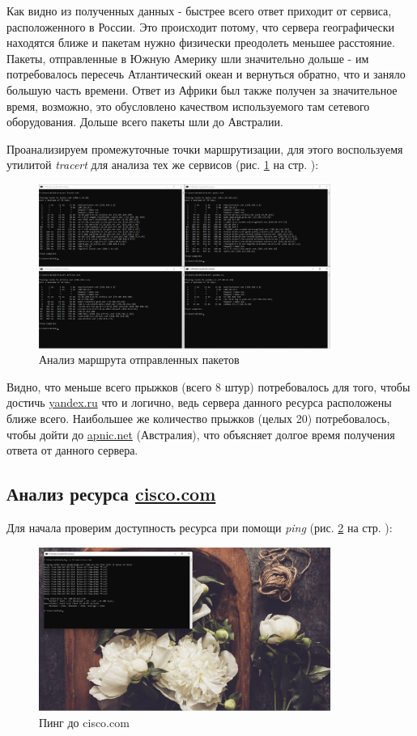 \documentclass[a4paper]{article}
\begin{document}
  Как видно из полученных данных - быстрее всего ответ приходит от сервиса, расположенного в России.
  Это происходит потому, что сервера географически находятся ближе и пакетам нужно физически преодолеть меньшее 
  расстояние. Пакеты, отправленные в Южную Америку шли значительно дольше - им потребовалось пересечь
  Атлантический океан и вернуться обратно, что и заняло большую часть времени.
  Ответ из Африки был также получен за значительное время, возможно, это обусловлено качеством используемого
  там сетевого оборудования. Дольше всего пакеты шли до Австралии.

  Проанализируем промежуточные точки маршрутизации, для этого воспользуемя утилитой \textit{tracert}
  для анализа тех же сервисов (рис. \ref{img:0002} на стр. \pageref{img:0002}):
  \begin{figure}[H]
    \centering
    \includegraphics[width=0.85\textwidth]{05_0002}
    \caption{Анализ маршрута отправленных пакетов}
    \label{img:0002}
  \end{figure}

  Видно, что меньше всего прыжков (всего 8 штур) потребовалось для того, чтобы достичь \href{yandex.ru}{yandex.ru} что и
  логично, ведь сервера данного ресурса расположены ближе всего. Наибольшее же количество прыжков (целых 20)
  потребовалось, чтобы дойти до \href{apnic.net}{apnic.net} (Австралия), что объясняет долгое время получения
  ответа от данного сервера.

  \subsection{Анализ ресурса \href{cisco.com}{cisco.com}}

  Для начала проверим доступность ресурса при помощи \textit{ping} (рис. \ref{img:0003} на стр. \pageref{img:0003}):
  \begin{figure}[H]
    \centering
    \includegraphics[width=0.85\textwidth]{05_0003}
    \caption{Пинг до cisco.com}
    \label{img:0003}
  \end{figure}
\end{document}
